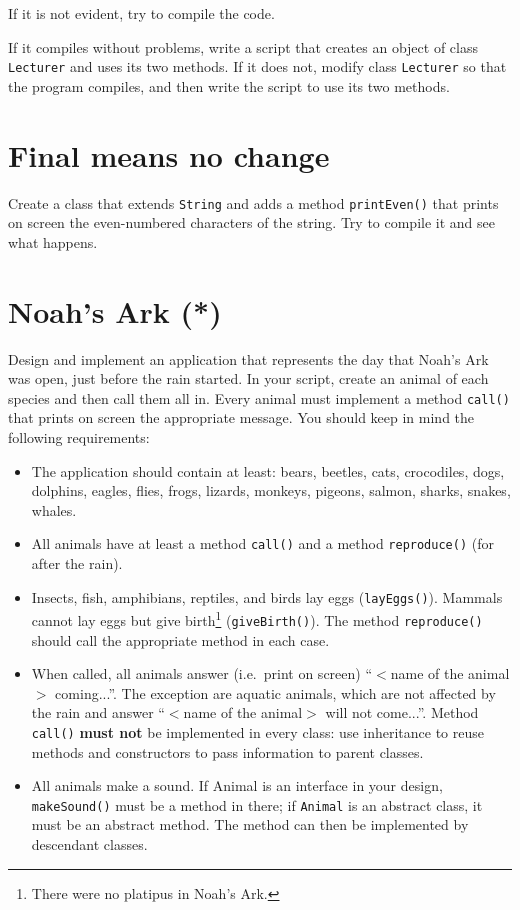 \documentclass{article}
\begin{document}
If it is not evident, try to compile the code. 

If it compiles without problems, write a script that creates an object
of class \verb+Lecturer+ and uses its two methods. If it does not,
modify class \verb+Lecturer+ so that the program compiles, and then
write the script to use its two methods. 


\section{Final means no change}
\label{sec:final-means-no}

Create a class that extends \verb+String+ and adds a method
\verb+printEven()+ that prints on screen the even-numbered characters
of the string. Try to compile it and see what happens. 

\section{Noah's Ark (*)}
\label{sec:noahs-ark}

Design and implement an application that represents the day that
Noah's Ark was open, just before the rain started. In your script,
create an animal of each species and then call them all in. Every animal
must implement a method \verb+call()+ that prints on screen the
appropriate message. You should keep in mind the following
requirements: 

\begin{itemize}
\item The application should contain at least: bears, beetles, cats,
  crocodiles, dogs, dolphins, eagles, flies, frogs, lizards, monkeys,
  pigeons, salmon, sharks, snakes, whales.
\item All animals have at least a method \verb+call()+ and a method
  \verb+reproduce()+ (for after the rain). 
\item Insects, fish, amphibians, reptiles, and birds lay eggs
  (\verb+layEggs()+). Mammals cannot lay eggs but give
  birth\footnote{There were no platipus in Noah's Ark.}
  (\verb+giveBirth()+). The method \verb+reproduce()+ 
  should call the appropriate method in each case.
\item When called, all animals answer (i.e.~print on screen) ``$<$name of
  the animal$>$ coming...''. The exception are aquatic animals,
  which are not affected by the rain and answer ``$<$name of the animal$>$
  will not come...''. Method \verb+call()+ \textbf{must not} be implemented in
  every class: use inheritance to reuse methods and constructors to
  pass information to parent classes.
\item All animals make a sound. If Animal is an interface in your
  design, \verb+makeSound()+ must be a method in there; if
  \verb+Animal+ is an abstract class, it must be an abstract
  method. The method can then be implemented by descendant classes.
\end{itemize}
\end{document}
